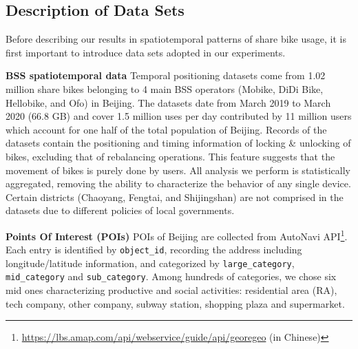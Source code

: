 \documentclass[ijgi,submit,moreauthors,pdftex]{Definitions/mdpi}
\begin{document}
\subsection{Description of Data Sets}
Before describing our results in spatiotemporal patterns of share bike usage, it is first important to introduce data sets adopted in our experiments.

\textbf{BSS spatiotemporal data} Temporal positioning datasets come from 1.02 million share bikes belonging to 4 main BSS operators (Mobike, DiDi Bike, Hellobike, and Ofo) in Beijing.
The datasets date from March 2019 to March 2020 (66.8 GB) and cover 1.5 million uses per day contributed by 11 million users which account for one half of the total population of Beijing.
Records of the datasets contain the positioning and timing information of locking \& unlocking of bikes, excluding that of rebalancing operations.
This feature suggests that the movement of bikes is purely done by users.
All analysis we perform is statistically aggregated, removing the ability to characterize the behavior of any single device.
Certain districts (Chaoyang, Fengtai, and Shijingshan) are not comprised in the datasets due to different policies of local governments.

\textbf{Points Of Interest (POIs)} POIs of Beijing are collected from AutoNavi API\footnote{\url{https://lbs.amap.com/api/webservice/guide/api/georegeo} (in Chinese)}.
Each entry is identified by \texttt{object\_id}, recording the address including longitude/latitude information, and categorized by \texttt{large\_category}, \texttt{mid\_category} and \texttt{sub\_category}.
Among hundreds of categories, we chose six mid ones characterizing productive and social activities: residential area (RA), tech company, other company, subway station, shopping plaza and supermarket.
\end{document}
